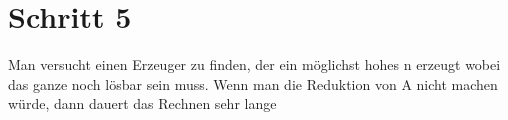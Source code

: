 \section{Schritt 5}
Man versucht einen Erzeuger zu finden, der ein möglichst hohes n erzeugt wobei das ganze noch lösbar sein muss. Wenn man die Reduktion von A nicht machen würde, dann dauert das Rechnen sehr lange